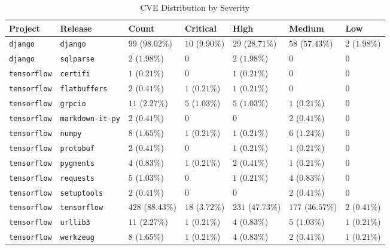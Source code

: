 \begin{table}
\caption{CVE Distribution by Severity}
\label{tab:cve-distribution}
\begin{tabular}{lllllll}
\toprule
Project & Release & Count & Critical & High & Medium & Low \\
\midrule
\texttt{django} & \texttt{django} & $99$ ($98.02\%$) & $10$ ($9.90\%$) & $29$ ($28.71\%$) & $58$ ($57.43\%$) & $2$ ($1.98\%$) \\
\texttt{django} & \texttt{sqlparse} & $2$ ($1.98\%$) & $0$ & $2$ ($1.98\%$) & $0$ & $0$ \\
\texttt{tensorflow} & \texttt{certifi} & $1$ ($0.21\%$) & $0$ & $1$ ($0.21\%$) & $0$ & $0$ \\
\texttt{tensorflow} & \texttt{flatbuffers} & $2$ ($0.41\%$) & $1$ ($0.21\%$) & $1$ ($0.21\%$) & $0$ & $0$ \\
\texttt{tensorflow} & \texttt{grpcio} & $11$ ($2.27\%$) & $5$ ($1.03\%$) & $5$ ($1.03\%$) & $1$ ($0.21\%$) & $0$ \\
\texttt{tensorflow} & \texttt{markdown-it-py} & $2$ ($0.41\%$) & $0$ & $0$ & $2$ ($0.41\%$) & $0$ \\
\texttt{tensorflow} & \texttt{numpy} & $8$ ($1.65\%$) & $1$ ($0.21\%$) & $1$ ($0.21\%$) & $6$ ($1.24\%$) & $0$ \\
\texttt{tensorflow} & \texttt{protobuf} & $2$ ($0.41\%$) & $0$ & $1$ ($0.21\%$) & $1$ ($0.21\%$) & $0$ \\
\texttt{tensorflow} & \texttt{pygments} & $4$ ($0.83\%$) & $1$ ($0.21\%$) & $2$ ($0.41\%$) & $1$ ($0.21\%$) & $0$ \\
\texttt{tensorflow} & \texttt{requests} & $5$ ($1.03\%$) & $0$ & $1$ ($0.21\%$) & $4$ ($0.83\%$) & $0$ \\
\texttt{tensorflow} & \texttt{setuptools} & $2$ ($0.41\%$) & $0$ & $0$ & $2$ ($0.41\%$) & $0$ \\
\texttt{tensorflow} & \texttt{tensorflow} & $428$ ($88.43\%$) & $18$ ($3.72\%$) & $231$ ($47.73\%$) & $177$ ($36.57\%$) & $2$ ($0.41\%$) \\
\texttt{tensorflow} & \texttt{urllib3} & $11$ ($2.27\%$) & $1$ ($0.21\%$) & $4$ ($0.83\%$) & $5$ ($1.03\%$) & $1$ ($0.21\%$) \\
\texttt{tensorflow} & \texttt{werkzeug} & $8$ ($1.65\%$) & $1$ ($0.21\%$) & $4$ ($0.83\%$) & $2$ ($0.41\%$) & $1$ ($0.21\%$) \\
\bottomrule
\end{tabular}
\end{table}
